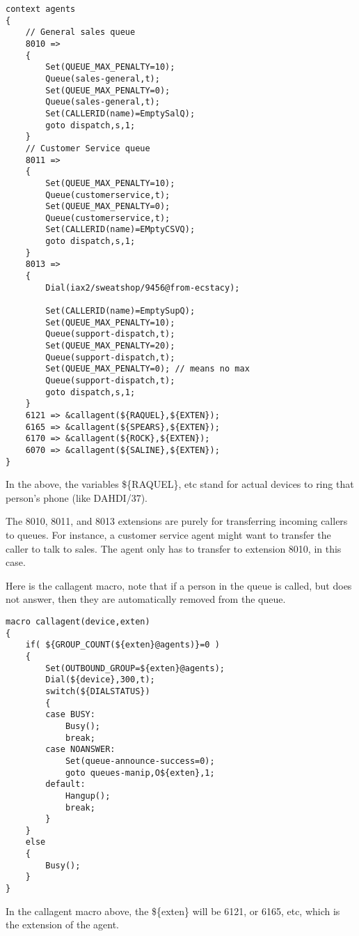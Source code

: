 \begin{astlisting}
\begin{verbatim}
context agents
{
	// General sales queue
	8010 =>
	{
		Set(QUEUE_MAX_PENALTY=10);
		Queue(sales-general,t);
		Set(QUEUE_MAX_PENALTY=0);
		Queue(sales-general,t);
		Set(CALLERID(name)=EmptySalQ);
		goto dispatch,s,1;
	}
	// Customer Service queue
	8011 =>
	{
		Set(QUEUE_MAX_PENALTY=10);
		Queue(customerservice,t);
		Set(QUEUE_MAX_PENALTY=0);
		Queue(customerservice,t);
		Set(CALLERID(name)=EMptyCSVQ);
		goto dispatch,s,1;
	}
	8013 =>
	{
		Dial(iax2/sweatshop/9456@from-ecstacy);

		Set(CALLERID(name)=EmptySupQ);
		Set(QUEUE_MAX_PENALTY=10);
		Queue(support-dispatch,t);
		Set(QUEUE_MAX_PENALTY=20);
		Queue(support-dispatch,t);
		Set(QUEUE_MAX_PENALTY=0); // means no max
		Queue(support-dispatch,t);
		goto dispatch,s,1;
	}
	6121 => &callagent(${RAQUEL},${EXTEN});
	6165 => &callagent(${SPEARS},${EXTEN});
	6170 => &callagent(${ROCK},${EXTEN});
	6070 => &callagent(${SALINE},${EXTEN});
}
\end{verbatim}
\end{astlisting}

In the above, the variables \$\{RAQUEL\}, etc stand for
actual devices to ring that person's
phone (like DAHDI/37).

The 8010, 8011, and 8013 extensions are purely for transferring
incoming callers to queues. For instance, a customer service
agent might want to transfer the caller to talk to sales. The
agent only has to transfer to extension 8010, in this case.

Here is the callagent macro, note that if a person in the
queue is called, but does not answer, then they are automatically
removed from the queue.

\begin{astlisting}
\begin{verbatim}
macro callagent(device,exten)
{
	if( ${GROUP_COUNT(${exten}@agents)}=0 )
	{
		Set(OUTBOUND_GROUP=${exten}@agents);
		Dial(${device},300,t);
		switch(${DIALSTATUS})
		{
		case BUSY:
			Busy();
			break;
		case NOANSWER:
			Set(queue-announce-success=0);
			goto queues-manip,O${exten},1;
		default:
			Hangup();
			break;
		}
	}
	else
	{
		Busy();
	}
}
\end{verbatim}
\end{astlisting}

In the callagent macro above, the \$\{exten\} will
be 6121, or 6165, etc, which is the extension of the agent.

